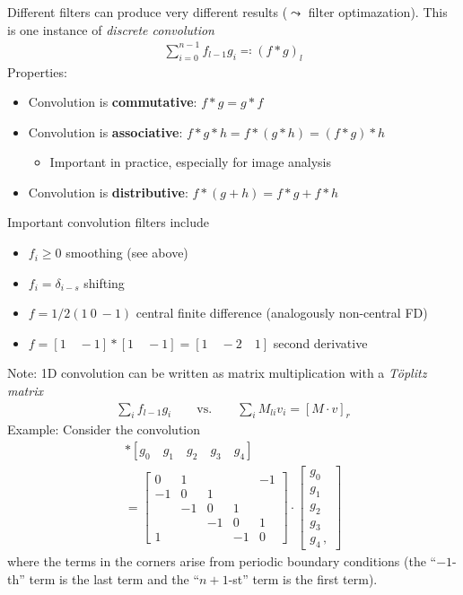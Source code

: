 Different filters can produce very different results ($\leadsto$ filter
optimazation). This is one instance of \emph{discrete convolution}
\begin{gather*}
  \sum_{i=0}^{n-1}f_{l-1}g_i \eqqcolon (f \ast g)_l
\end{gather*}
Properties:
\begin{itemize}
\item Convolution is \textbf{commutative}: $f \ast g = g \ast f$
\item Convolution is \textbf{associative}:
  $f \ast g \ast h = f \ast (g \ast h) = (f \ast g) \ast h$
  \begin{itemize}
  \item Important in practice, especially for image analysis
  \end{itemize}
\item Convolution is \textbf{distributive}:
  $f \ast (g + h) = f \ast g + f \ast h$
\end{itemize}
Important convolution filters include
\begin{itemize}
\item $f_i \ge 0$ smoothing (see above)
\item $f_i = \delta_{i-s}$ shifting
\item $f = 1/2(1 \ 0 \ -1)$ central finite difference (analogously non-central
  FD)
\item $f = [1\quad -1] \ast [1\quad -1] = [1\quad -2\quad 1]$ second derivative
\end{itemize}
Note: 1D convolution can be written as matrix multiplication with a
\emph{Töplitz matrix}
\begin{gather*}
  \sum_i f_{l-1}g_i \qquad \text{vs.} \qquad \sum_i M_{li}v_i = [M\cdot v]_r
\end{gather*}
Example: Consider the convolution
\begin{gather*}
  [1 \quad 0 \quad -1] \ast [g_0\quad g_1\quad g_2\quad g_3 \quad g_4] \\
  =
  \begin{bmatrix}
    0 & 1 & & & -1 \\
    -1 & 0 & 1 & & \\
    & -1 & 0 & 1 & \\
    & & -1 & 0 & 1 \\
    1 & & & -1 & 0
  \end{bmatrix}\cdot
  \begin{bmatrix}
    g_0 \\ g_1 \\ g_2 \\ g_3 \\ g_4\,,
  \end{bmatrix}
\end{gather*}
where the terms in the corners arise from periodic boundary conditions (\ie the
``$-1$-th'' term is the last term and the ``$n+1$-st'' term is the first term).


